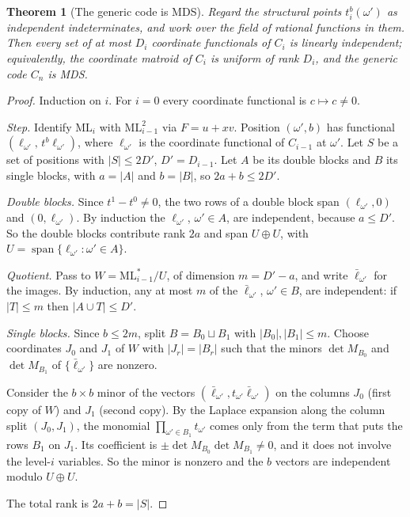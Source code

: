 \documentclass[11pt]{article}
\newtheorem{theorem}{Theorem}[section]
\theoremstyle{definition}
\newcommand{\ML}{\mathrm{ML}}
\begin{document}
\begin{theorem}[The generic code is MDS]\label{thm:generic}
Regard the structural points $t^b_i(\omega')$ as independent indeterminates, and work over the
field of rational functions in them. Then every set of at most $D_i$ coordinate functionals of
$C_i$ is linearly independent; equivalently, the coordinate matroid of $C_i$ is uniform of rank
$D_i$, and the generic code $C_n$ is MDS.
\end{theorem}
\begin{proof}
Induction on $i$. For $i=0$ every coordinate functional is $c\mapsto c\neq0$.

\emph{Step.} Identify $\ML_i$ with $\ML_{i-1}^2$ via $F=u+xv$. Position $(\omega',b)$ has functional
$(\ell_{\omega'},\,t^b\ell_{\omega'})$, where $\ell_{\omega'}$ is the coordinate functional of $C_{i-1}$
at $\omega'$. Let $S$ be a set of positions with $|S|\le 2D'$, $D'=D_{i-1}$. Let $A$ be its double
blocks and $B$ its single blocks, with $a=|A|$ and $b=|B|$, so $2a+b\le2D'$.

\emph{Double blocks.} Since $t^1-t^0\neq0$, the two rows of a double block span
$(\ell_{\omega'},0)$ and $(0,\ell_{\omega'})$. By induction the $\ell_{\omega'}$, $\omega'\in A$, are
independent, because $a\le D'$. So the double blocks contribute rank $2a$ and span $U\oplus U$,
with $U=\operatorname{span}\{\ell_{\omega'}:\omega'\in A\}$.

\emph{Quotient.} Pass to $W=\ML_{i-1}^*/U$, of dimension $m=D'-a$, and write
$\bar\ell_{\omega'}$ for the images. By induction, any at most $m$ of the $\bar\ell_{\omega'}$,
$\omega'\in B$, are independent: if $|T|\le m$ then $|A\cup T|\le D'$.

\emph{Single blocks.} Since $b\le2m$, split $B=B_0\sqcup B_1$ with $|B_0|,|B_1|\le m$. Choose
coordinates $J_0$ and $J_1$ of $W$ with $|J_r|=|B_r|$ such that the minors $\det M_{B_0}$ and
$\det M_{B_1}$ of $\{\bar\ell_{\omega'}\}$ are nonzero.

Consider the $b\times b$ minor of the vectors $(\bar\ell_{\omega'},t_{\omega'}\bar\ell_{\omega'})$ on
the columns $J_0$ (first copy of $W$) and $J_1$ (second copy). By the Laplace expansion along the
column split $(J_0,J_1)$, the monomial $\prod_{\omega'\in B_1}t_{\omega'}$ comes only from the term
that puts the rows $B_1$ on $J_1$. Its coefficient is $\pm\det M_{B_0}\det M_{B_1}\neq0$, and it
does not involve the level-$i$ variables. So the minor is nonzero and the $b$ vectors are
independent modulo $U\oplus U$.

The total rank is $2a+b=|S|$.
\end{proof}
\end{document}
